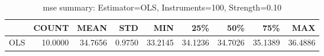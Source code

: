 \begin{table}[ht]
\centering
\caption{mse summary: Estimator=OLS, Instruments=100, Strength=0.10}
\begin{tabular}{lrrrrrrrr}
\toprule
 & COUNT & MEAN & STD & MIN & 25\% & 50\% & 75\% & MAX \\
\midrule
OLS & 10.0000 & 34.7656 & 0.9750 & 33.2145 & 34.1236 & 34.7026 & 35.1389 & 36.4886 \\
\bottomrule
\end{tabular}
\end{table}
